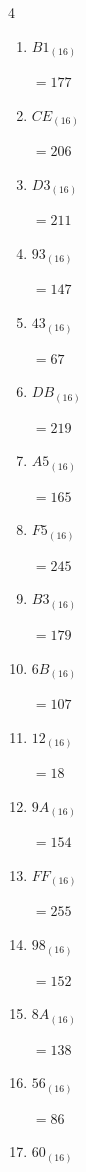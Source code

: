 \begin{multicols}{4}
\begin{enumerate}
  \item $B1_{(16)}$

        $=177$

  \item $CE_{(16)}$

        $=206$

  \item $D3_{(16)}$

        $=211$

  \item $93_{(16)}$

        $=147$

\columnbreak %

  \item $43_{(16)}$

        $=67$

  \item $DB_{(16)}$

        $=219$

  \item $A5_{(16)}$

        $=165$

  \item $F5_{(16)}$

        $=245$

  \item $B3_{(16)}$

        $=179$

  \item $6B_{(16)}$

        $=107$

  \item $12_{(16)}$

        $=18$

  \item $9A_{(16)}$

        $=154$

  \item $FF_{(16)}$

        $=255$

  \item $98_{(16)}$

        $=152$

  \item $8A_{(16)}$

        $=138$

  \item $56_{(16)}$

        $=86$

  \item $60_{(16)}$


\end{enumerate}
\end{multicols}
